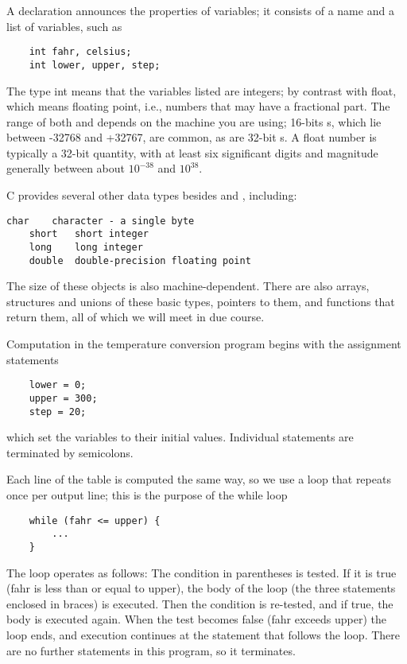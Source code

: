 A declaration announces the properties of variables; it consists of a name and a list of variables, such as
\begin{lstlisting}
	int fahr, celsius;
	int lower, upper, step;
\end{lstlisting}
The type int means that the variables listed are integers; by contrast with float, which means floating point, i.e., numbers that may have a fractional part.
The range of both  and  depends on the machine you are using; 16-bits s, which lie between -32768 and +32767, are common, as are 32-bit s.
A float number is typically a 32-bit quantity, with at least six significant digits and magnitude generally between about $10^{-38}$ and $10^38$.

C provides several other data types besides  and , including:
\begin{lstlisting}[basicstyle=\ttfamily\normalsize\itshape, keywordstyle=\color{black}]
	char 	character - a single byte
	short 	short integer
	long 	long integer
	double 	double-precision floating point
\end{lstlisting}
The size of these objects is also machine-dependent.
There are also arrays, structures and unions of these basic types, pointers to them, and functions that return them, all of which we will meet in due course.

Computation in the temperature conversion program begins with the assignment statements
\begin{lstlisting}
	lower = 0;
	upper = 300;
	step = 20;
\end{lstlisting}
which set the variables to their initial values. Individual statements are terminated by semicolons.

Each line of the table is computed the same way, so we use a loop that repeats once per output line; this is the purpose of the while loop
\begin{lstlisting}
	while (fahr <= upper) {
		...
	}
\end{lstlisting}

The  loop operates as follows:
The condition in parentheses is tested.
If it is true (fahr is less than or equal to upper), the body of the loop (the three statements enclosed in braces) is executed.
Then the condition is re-tested, and if true, the body is executed again.
When the test becomes false (fahr exceeds upper) the loop ends, and execution continues at the statement that follows the loop.
There are no further statements in this program, so it terminates.

